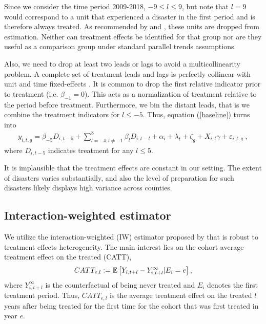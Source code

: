 Since we consider the time period 2009-2018, $-9 \leq l \leq 9$, but note that $l = 9$ would correspond to a unit that experienced a disaster in the first period and is therefore always treated. As recommended by \cite{Sun_2021} and \cite{Callaway_2021}, these units are dropped from estimation. Neither can treatment effects be identified for that group nor are they useful as a comparison group under standard parallel trends assumptions.

Also, we need to drop at least two leads or lags to avoid a multicollinearity problem. A complete set of treatment leads and lags is perfectly collinear with unit and time fixed-effects \citep[for an extensive discussion of this issue see][section 3.2]{Borusyak_2021}. It is common to drop the first relative indicator prior to treatment (i.e. $\beta_{-1} = 0$). This acts as a normalization of treatment relative to the period before treatment. Furthermore, we bin the distant leads, that is we combine the treatment indicators for $l \leq -5$. Thus, equation (\ref{baseline}) turns into
\begin{align} \label{baselineBinned}
	y_{i, t, g} = \beta_{-5}  D_{i, t-5} + \sum_{l = -4, l \neq -1}^{8} \beta_l D_{i, t-l} + \alpha_i + \lambda_t + \zeta_g + X_{i, t} \gamma + \varepsilon_{i, t, g} \;,
\end{align}
where $D_{i, t-5}$ indicates treatment for any $l \leq 5$.

It is implausible that the treatment effects are constant in our setting. The extent of disasters varies substantially, and also the level of preparation for such disasters likely displays high variance across counties. 

\subsection{Interaction-weighted estimator}

We utilize the interaction-weighted (IW) estimator proposed by \cite{Sun_2021} that is robust to treatment effects heterogeneity. The main interest lies on the cohort average treatment effect on the treated (CATT),
\begin{align*}
	CATT_{e, l} := \mathbb{E} \left[ Y_{i, t+l} - Y_{i, t+l}^{\infty} | E_i = e \right],
\end{align*}
where $Y_{i, t+l}^{\infty}$ is the counterfactual of being never treated and $E_i$ denotes the first treatment period. Thus, $CATT_{e, l}$ is the average treatment effect on the treated $l$ years after being treated for the first time for the cohort that was first treated in year $e$.

